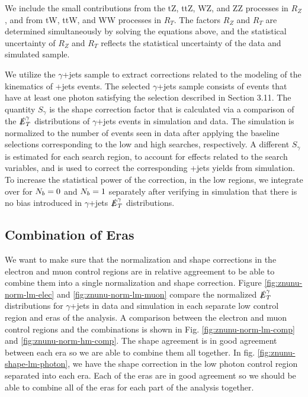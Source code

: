 We include the small contributions from the tZ, ttZ, WZ, and ZZ processes in $R_Z$, and from tW, ttW, and WW processes in $R_T$. The factors $R_Z$ and $R_T$ are determined simultaneously by solving the equations above, and the statistical uncertainty of $R_Z$ and $R_T$ reflects the statistical uncertainty of the data and simulated sample.


We utilize the $\gamma$+jets sample to extract corrections related to the modeling of the kinematics of \Znunu+jets events. The selected $\gamma$+jets sample consists of events that have at least one photon satisfying the selection described in Section 3.11. The quantity $S_\gamma$ is the shape correction factor that is calculated via a comparison of the $\slashed{E}_{T}^\gamma$ distributions of $\gamma$+jets events in simulation and data. The simulation is normalized to the number of events seen in data after applying the baseline selections corresponding to the low and high \dm{} searches, respectively. A different $S_\gamma$ is estimated for each search region, to account for effects related to the search variables, and is used to correct the corresponding \Znunu+jets yields from simulation. To increase the statistical power of the correction, in the low \dm{} regions, we integrate over \nsv{} for $N_{b}=0$ and $N_{b}=1$ separately after verifying in simulation that there is no bias introduced in $\gamma$+jets $\slashed{E}_{T}^\gamma$ distributions.

\subsection{Combination of Eras}\label{subsec:znunucombine}

We want to make sure that the normalization and shape corrections in the electron and muon control regions are in relative aggreement to be able to combine them into a single normalization and shape correction. Figure \ref{fig:znunu-norm-lm-elec} and \ref{fig:znunu-norm-lm-muon} compare the normalized $\slashed{E}_{T}^\gamma$ distributions for $\gamma$+jets in data and simulation in each separate low \dm{} control region and eras of the analysis. A comparison between the electron and muon control regions and the combinations is shown in Fig. \ref{fig:znunu-norm-lm-comp} and \ref{fig:znunu-norm-hm-comp}. The shape agreement is in good agreement between each era so we are able to combine them all together. In fig. \ref{fig:znunu-shape-lm-photon}, we have the shape correction in the low \dm{} photon control region separated into each era. Each of the eras are in good agreement so we should be able to combine all of the eras for each part of the analysis together.

